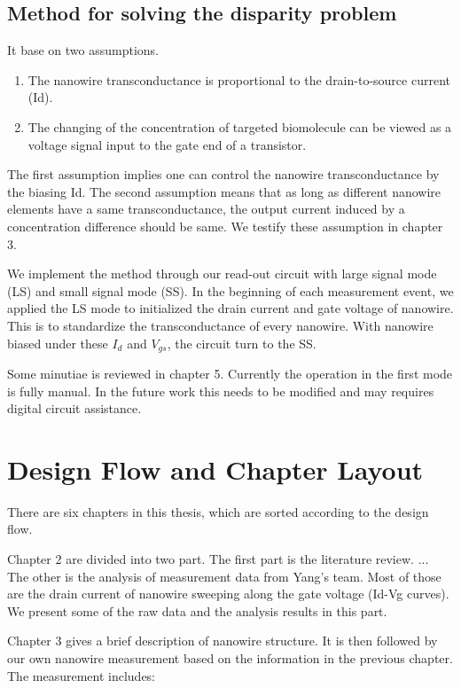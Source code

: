 \subsection*{Method for solving the disparity problem}
It base on two assumptions.
\begin{enumerate}
    \item The nanowire transconductance is proportional to the drain-to-source current (Id).
    \item The changing of the concentration of targeted biomolecule can be viewed as a voltage signal input to the gate end of a transistor.
\end{enumerate}
The first assumption implies one can control the nanowire transconductance by the biasing Id.
The second assumption means that as long as different nanowire elements have a same transconductance, the output current induced by a concentration difference should be same.
We testify these assumption in chapter 3.

We implement the method through our read-out circuit with large signal mode (LS) and small signal mode (SS).
In the beginning of each measurement event, we applied the LS mode to initialized the drain current and gate voltage of nanowire.
This is to standardize the transconductance of every nanowire.
With nanowire biased under these $I_d$ and $V_{gs}$, the circuit turn to the SS.

Some minutiae is reviewed in chapter 5.
Currently the operation in the first mode is fully manual.
In the future work this needs to be modified and may requires digital circuit assistance.


\section{Design Flow and Chapter Layout}
There are six chapters in this thesis, which are sorted according to the design flow.

Chapter 2 are divided into two part.
The first part is the literature review. {\color{red}...} The other is the analysis of measurement data from Yang's team.
Most of those are the drain current of nanowire sweeping along the gate voltage (Id-Vg curves).
We present some of the raw data and the analysis results in this part.

Chapter 3 gives a brief description of nanowire structure.
It is then followed by our own nanowire measurement based on the information in the previous chapter.
The measurement includes:

